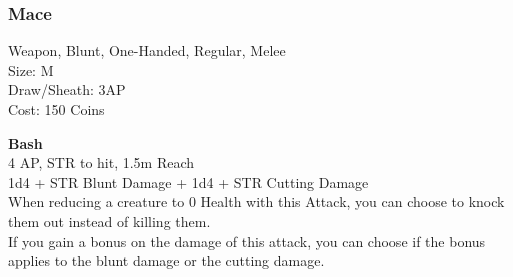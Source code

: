 \subsubsection{Mace}\label{weapon:mace}
Weapon, Blunt, One-Handed, Regular, Melee\\
Size: M\\
Draw/Sheath: 3AP\\
Cost: 150 Coins

\textbf{Bash}\\
4 AP, STR to hit, 1.5m Reach\\
1d4 + \texttimes STR Blunt Damage + 1d4 + \texttimes STR Cutting Damage\\
When reducing a creature to 0 Health with this Attack, you can choose to knock them out instead of killing them.\\
If you gain a bonus on the damage of this attack, you can choose if the bonus applies to the blunt damage or the cutting damage.